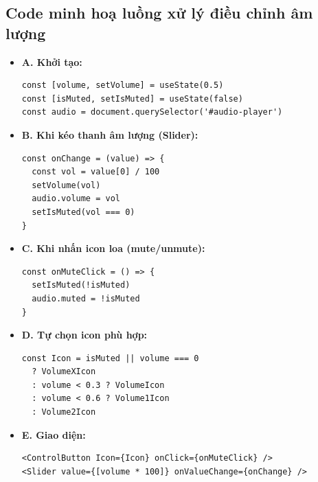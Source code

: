 \begin{enumerate}
  \subsection*{Code minh hoạ luồng xử lý điều chỉnh âm lượng}

\begin{itemize}
  \item \textbf{A. Khởi tạo:}
  \begin{verbatim}
const [volume, setVolume] = useState(0.5)
const [isMuted, setIsMuted] = useState(false)
const audio = document.querySelector('#audio-player')
  \end{verbatim}

  \item \textbf{B. Khi kéo thanh âm lượng (Slider):}
  \begin{verbatim}
const onChange = (value) => {
  const vol = value[0] / 100
  setVolume(vol)
  audio.volume = vol
  setIsMuted(vol === 0)
}
  \end{verbatim}

  \item \textbf{C. Khi nhấn icon loa (mute/unmute):}
  \begin{verbatim}
const onMuteClick = () => {
  setIsMuted(!isMuted)
  audio.muted = !isMuted
}
  \end{verbatim}

  \item \textbf{D. Tự chọn icon phù hợp:}
  \begin{verbatim}
const Icon = isMuted || volume === 0
  ? VolumeXIcon
  : volume < 0.3 ? VolumeIcon
  : volume < 0.6 ? Volume1Icon
  : Volume2Icon
  \end{verbatim}

  \item \textbf{E. Giao diện:}
  \begin{verbatim}
<ControlButton Icon={Icon} onClick={onMuteClick} />
<Slider value={[volume * 100]} onValueChange={onChange} />
  \end{verbatim}
\end{itemize}

\end{enumerate}
